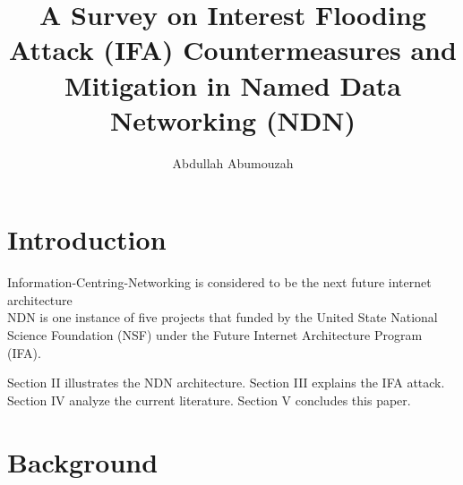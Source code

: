 \documentclass[twocolumn]{article}
\title{A Survey on Interest Flooding Attack (IFA) Countermeasures and Mitigation in Named Data Networking (NDN)}
\author{Abdullah Abumouzah }
\begin{document}
\maketitle

\begin{abstract}

\end{abstract}

\nocite{*}
\section{Introduction}
Information-Centring-Networking is considered to be the next future internet architecture \cite{Ahlgren2012}\\
NDN is one instance of five projects that funded by the United State National Science Foundation (NSF) under the Future Internet Architecture Program (IFA). 

Section II illustrates the NDN architecture. Section III explains the IFA attack. Section IV analyze the current literature. Section V concludes this paper.   

\section{Background}
\end{document}
